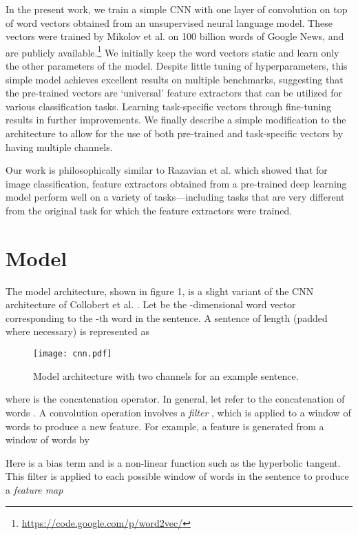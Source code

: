\documentclass[11pt]{article}
\begin{document}
In the present work, we train a simple CNN with one layer of convolution on top of word vectors obtained from an unsupervised neural language model. These vectors were trained by Mikolov et al.  on 100 billion words of Google News, and are publicly available.\footnote{\url{https://code.google.com/p/word2vec/}} We initially keep the word vectors static and learn only the other parameters of the model. Despite little tuning of hyperparameters, this simple model achieves excellent results on multiple benchmarks, suggesting that the pre-trained vectors are `universal' feature extractors that can be utilized for various classification tasks. Learning task-specific vectors through fine-tuning results in further improvements. We finally describe a simple modification to the architecture to allow for the use of both pre-trained and task-specific vectors by having multiple channels.

Our work is philosophically similar to Razavian et al.  which showed that for image classification, feature extractors obtained from a pre-trained deep learning model perform well on a variety of tasks---including tasks that are very different from the original task for which the feature extractors were trained.

\section{Model}
The model architecture, shown in figure 1, is a slight variant of the CNN architecture of Collobert et al. . Let  be the -dimensional word vector corresponding to the -th word in the sentence. A sentence of length  (padded where necessary) is represented as
\begin{figure*}
  \center
  \texttt{[image: cnn.pdf]}
\vspace{-6.7cm}
  \caption{Model architecture with two channels for an example sentence.}
\end{figure*}


where  is the concatenation operator. In general, let  refer to the concatenation of words .
A convolution operation involves a \emph{filter} , which is applied to a window of  words to produce a new feature. For example, a feature  is generated from a window of words  by

Here  is a bias term and  is a non-linear function such as the hyperbolic tangent. This filter is applied to each possible window of words in the sentence  to produce a \emph{feature map}
\end{document}

